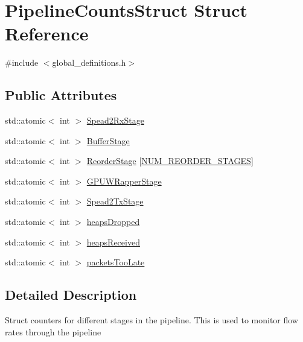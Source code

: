 \hypertarget{struct_pipeline_counts_struct}{}\section{Pipeline\+Counts\+Struct Struct Reference}
\label{struct_pipeline_counts_struct}


{\ttfamily \#include $<$global\+\_\+definitions.\+h$>$}

\subsection*{Public Attributes}
\begin{DoxyCompactItemize}
\item 
std\+::atomic$<$ int $>$ \hyperlink{struct_pipeline_counts_struct_a82ae1fa7ae44646e7d76f52f46d53d51}{Spead2\+Rx\+Stage}
\item 
std\+::atomic$<$ int $>$ \hyperlink{struct_pipeline_counts_struct_ac9f597d988bf273feee0a10fad2a7a71}{Buffer\+Stage}
\item 
std\+::atomic$<$ int $>$ \hyperlink{struct_pipeline_counts_struct_a4561cd0dd5f2be78e2ca3b775323bf98}{Reorder\+Stage} \mbox{[}\hyperlink{global__definitions_8h_a704a3e35bae9856130cd40f52f14469c}{N\+U\+M\+\_\+\+R\+E\+O\+R\+D\+E\+R\+\_\+\+S\+T\+A\+G\+ES}\mbox{]}
\item 
std\+::atomic$<$ int $>$ \hyperlink{struct_pipeline_counts_struct_a613300f0885bdeee4d0724651c7aaaf0}{G\+P\+U\+W\+Rapper\+Stage}
\item 
std\+::atomic$<$ int $>$ \hyperlink{struct_pipeline_counts_struct_abaa985e5f295aaa25939f872be316ef9}{Spead2\+Tx\+Stage}
\item 
std\+::atomic$<$ int $>$ \hyperlink{struct_pipeline_counts_struct_a444def89d06e08f615dacefbde2ec792}{heaps\+Dropped}
\item 
std\+::atomic$<$ int $>$ \hyperlink{struct_pipeline_counts_struct_ab566310da0d343755e2609dd87942297}{heaps\+Received}
\item 
std\+::atomic$<$ int $>$ \hyperlink{struct_pipeline_counts_struct_a20f49082e3e3a14a26a6d47e1118afe6}{packets\+Too\+Late}
\end{DoxyCompactItemize}


\subsection{Detailed Description}
Struct counters for different stages in the pipeline. This is used to monitor flow rates through the pipeline 

